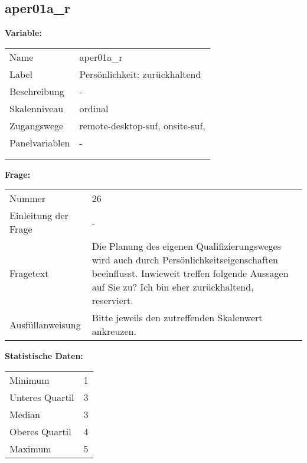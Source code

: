 	
	
	\subsection{aper01a\_r}
	\label{subSection:aper01a_r}

	\noindent\textbf{Variable:}\\
		\begin{tabular}{lL{11.3cm}}
			\label{tableVariable:aper01a_r}
			Name & aper01a\_r \\
			Label & Persönlichkeit: zurückhaltend \\
			Beschreibung & - \\
			Skalenniveau & ordinal \\
			Zugangswege &
				remote-desktop-suf,
				onsite-suf,
 \\
			Panelvariablen & -
			 \\
			 \\
 \\
		\end{tabular}

		\vspace*{1 cm}
		\noindent\textbf{Frage:}\\
		\begin{tabular}{lL{11.3cm}}
			\label{tableQuestion:aper01a_r}
			Nummer & 26 \\
			Einleitung der Frage & - \\
			Fragetext & Die Planung des eigenen Qualifizierungsweges wird auch durch Persönlichkeitseigenschaften beeinflusst. Inwieweit treffen folgende Aussagen auf Sie zu?
Ich bin eher zurückhaltend, reserviert. \\
			Ausfüllanweisung & Bitte jeweils den zutreffenden
Skalenwert ankreuzen. \\
		\end{tabular}


		\vspace*{1 cm}
		\noindent\textbf{Statistische Daten:}\\
			\begin{tabular}{ll}
				\label{tableStatistics:aper01a_r}
					Minimum & 1 \\
					Unteres Quartil & 3 \\
					Median & 3 \\
					Oberes Quartil & 4 \\
					Maximum & 5 \\
			\end{tabular}



